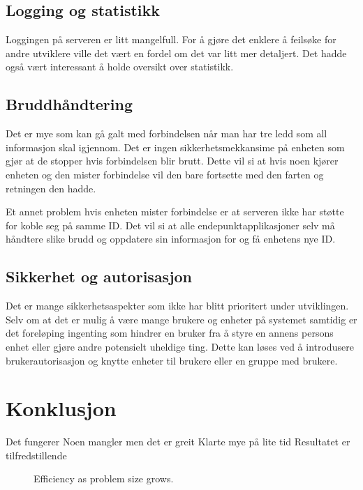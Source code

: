 \documentclass[12pt]{report}
\begin{document}
\section{Logging og statistikk}
Loggingen på serveren er litt mangelfull. For å gjøre det enklere å feilsøke for andre utviklere ville det vært en fordel om det var litt mer detaljert. Det hadde også vært interessant å holde oversikt over statistikk.

\section{Bruddhåndtering}
Det er mye som kan gå galt med forbindelsen når man har tre ledd som all informasjon skal igjennom. Det er ingen sikkerhetsmekkansime på enheten som gjør at de stopper hvis forbindelsen blir brutt. Dette vil si at hvis noen kjører enheten og den mister forbindelse vil den bare fortsette med den farten og retningen den hadde.

Et annet problem hvis enheten mister forbindelse er at serveren ikke har støtte for koble seg på samme ID. Det vil si at alle endepunktapplikasjoner selv må håndtere slike brudd og oppdatere sin informasjon for og få enhetens nye ID.

\section{Sikkerhet og autorisasjon}
Det er mange sikkerhetsaspekter som ikke har blitt prioritert under utviklingen. Selv om at det er mulig å være mange brukere og enheter på systemet samtidig er det foreløping ingenting som hindrer en bruker fra å styre en annens persons enhet eller gjøre andre potensielt uheldige ting. Dette kan løses ved å introdusere brukerautorisasjon og knytte enheter til brukere eller en gruppe med brukere. 

\clearpage

\chapter{Konklusjon}
Det fungerer
Noen mangler men det er greit
Klarte mye på lite tid
Resultatet er tilfredstillende



\begin{figure}[H]
	\centering
	\caption{Efficiency as problem size grows.}
	\label{scaling}
\end{figure}
\end{document}

